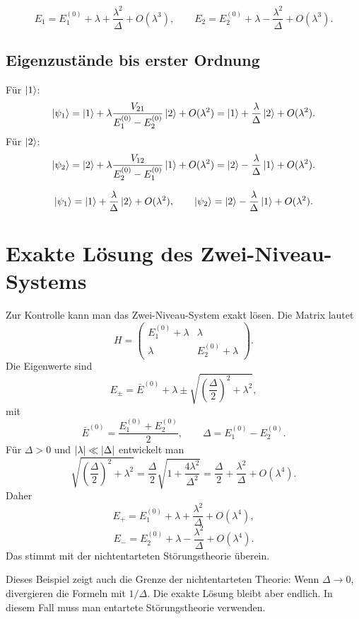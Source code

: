 \begin{answerbox}
\[
    E_1=E_1^{(0)}+\lambda+\frac{\lambda^2}{\Delta}+O(\lambda^3),
    \qquad
    E_2=E_2^{(0)}+\lambda-\frac{\lambda^2}{\Delta}+O(\lambda^3).
\]
\end{answerbox}

\subsection{Eigenzustände bis erster Ordnung}

Für \(\left|1\right\rangle\):
\[
    \left|\psi_1\right\rangle=\left|1\right\rangle+\lambda\frac{V_{21}}{E_1^{(0)}-E_2^{(0)}}\left|2\right\rangle+O(\lambda^2)
    =\left|1\right\rangle+\frac{\lambda}{\Delta}\left|2\right\rangle+O(\lambda^2).
\]
Für \(\left|2\right\rangle\):
\[
    \left|\psi_2\right\rangle=\left|2\right\rangle+\lambda\frac{V_{12}}{E_2^{(0)}-E_1^{(0)}}\left|1\right\rangle+O(\lambda^2)
    =\left|2\right\rangle-\frac{\lambda}{\Delta}\left|1\right\rangle+O(\lambda^2).
\]

\begin{answerbox}
\[
    \left|\psi_1\right\rangle=\left|1\right\rangle+\frac{\lambda}{\Delta}\left|2\right\rangle+O(\lambda^2),
    \qquad
    \left|\psi_2\right\rangle=\left|2\right\rangle-\frac{\lambda}{\Delta}\left|1\right\rangle+O(\lambda^2).
\]
\end{answerbox}

\section{Exakte Lösung des Zwei-Niveau-Systems}

Zur Kontrolle kann man das Zwei-Niveau-System exakt lösen. Die Matrix lautet
\[
    H=
    \begin{pmatrix}
        E_1^{(0)}+\lambda & \lambda\\
        \lambda & E_2^{(0)}+\lambda
    \end{pmatrix}.
\]
Die Eigenwerte sind
\[
    E_\pm=\bar E^{(0)}+\lambda
    \pm\sqrt{\left(\frac{\Delta}{2}\right)^2+\lambda^2},
\]
mit
\[
    \bar E^{(0)}=\frac{E_1^{(0)}+E_2^{(0)}}{2},
    \qquad
    \Delta=E_1^{(0)}-E_2^{(0)}.
\]
Für \(\Delta>0\) und \(\left| \lambda \right|\ll\left| \Delta \right|\) entwickelt man
\[
    \sqrt{\left(\frac{\Delta}{2}\right)^2+\lambda^2}
    =\frac{\Delta}{2}\sqrt{1+\frac{4\lambda^2}{\Delta^2}}
    =\frac{\Delta}{2}+\frac{\lambda^2}{\Delta}+O(\lambda^4).
\]
Daher
\[
    E_+=E_1^{(0)}+\lambda+\frac{\lambda^2}{\Delta}+O(\lambda^4),
\]
\[
    E_-=E_2^{(0)}+\lambda-\frac{\lambda^2}{\Delta}+O(\lambda^4).
\]
Das stimmt mit der nichtentarteten Störungstheorie überein.

\begin{notebox}
Dieses Beispiel zeigt auch die Grenze der nichtentarteten Theorie: Wenn \(\Delta\to 0\), divergieren die Formeln mit \(1/\Delta\). Die exakte Lösung bleibt aber endlich. In diesem Fall muss man entartete Störungstheorie verwenden.
\end{notebox}

